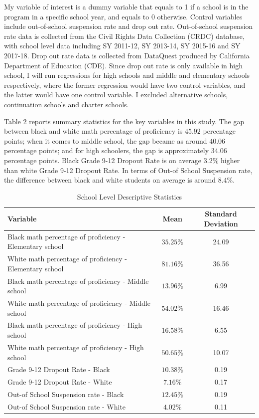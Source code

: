 \noindent My variable of interest is a dummy variable that equals to 1 if a school is in the program in a specific school year, and equals to 0 otherwise. Control variables include out-of-school suspension rate and drop out rate. Out-of-school suspension rate data is collected from the Civil Rights Data Collection (CRDC) database, with school level data including SY 2011-12, SY 2013-14, SY 2015-16 and SY 2017-18. Drop out rate data is collected from DataQuest produced by California Department of Education (CDE). Since drop out rate is only available in high school, I will run regressions for high schools and middle and elementary schools respectively, where the former regression would have two control variables, and the latter would have one control variable. I excluded alternative schools, continuation schools and charter schools.

Table 2 reports summary statistics for the key variables in this study. The gap between black and white math percentage of proficiency is $45.92$ percentage points; when it comes to middle school, the gap became as around $40.06$ percentage points; and for high schoolers, the gap is approximately $34.06$ percentage points. Black Grade 9-12 Dropout Rate is on average $3.2\%$ higher than white Grade 9-12 Dropout Rate. In terms of Out-of School Suspension rate, the difference between black and white students on average is around $8.4\%$. 

\begin{table}[H]
  \begin{center}
    \caption{School Level Descriptive Statistics}
    \label{tab:table1}
    \renewcommand{\arraystretch}{1.5}
    \begin{tabular}{l c c} %
      \hline
      \textbf{Variable} & \textbf{Mean} & \textbf{Standard Deviation}\\
      \hline
      Black math percentage of proficiency - Elementary school & $35.25\%$ & 24.09\\
      White math percentage of proficiency - Elementary school & $81.16\%$ & 36.56\\
      Black math percentage of proficiency - Middle school & $13.96\%$ & 6.99\\
      White math percentage of proficiency - Middle school & $54.02\%$ & 16.46\\
      Black math percentage of proficiency - High school & $16.58\%$ & 6.55\\
      White math percentage of proficiency - High school & $50.65\%$ & 10.07\\
      Grade 9-12 Dropout Rate - Black & $10.38\%$ & 0.19\\
      Grade 9-12 Dropout Rate - White & $7.16\%$ & 0.17\\
      Out-of School Suspension rate - Black & $12.45\%$ & 0.19\\
      Out-of School Suspension rate - White & $4.02\%$ & 0.11\\
      \hline
    \end{tabular}
  \end{center}
\end{table}

